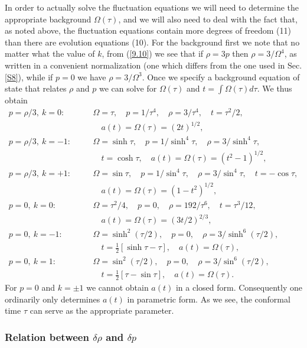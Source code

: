 In order to actually solve the fluctuation equations we will need to determine the appropriate background $\Omega(\tau)$, and we will also need to deal with the fact that, as noted above,  the fluctuation equations contain more degrees of freedom (11) than there are evolution equations (10). For the background first we note that no matter what the value of $k$, from (\ref{9.10}) we see that if $\rho=3p$ then $\rho=3/\Omega^4$,  as written in a convenient normalization (one which differs from the one used in Sec. \ref{S8}), while if $p=0$ we have $\rho=3/\Omega^3$. Once we specify a background equation of state that relates $\rho$ and $p$ we can solve for $\Omega (\tau)$ and $t=\int \Omega(\tau)d\tau$. We thus obtain 
%
\begin{eqnarray}
p=\rho/3,~k=0:&&\quad \Omega=\tau,\quad p=1/\tau^4,\quad \rho=3/\tau^4,\quad t=\tau^2/2,
\nonumber\\
&&\qquad a(t)=\Omega(\tau)=(2t)^{1/2},
\nonumber\\
p=\rho/3,~k=-1:&&\quad \Omega=\sinh\tau,\quad p=1/\sinh^4\tau,\quad \rho=3/\sinh^4\tau,
\nonumber\\
&& \qquad t=\cosh\tau,\quad a(t)=\Omega(\tau)=(t^2-1)^{1/2},
\nonumber\\
p=\rho/3,~k=+1:&&\quad \Omega=\sin\tau,\quad p=1/\sin^4\tau,\quad \rho=3/\sin^4\tau,\quad t=-\cos\tau,
\nonumber\\
&& \qquad a(t)=\Omega(\tau)=(1-t^2)^{1/2},
\nonumber\\
p=0,~k=0:&&\quad \Omega=\tau^2/4,\quad p=0,\quad \rho=192/\tau^6,\quad t=\tau^{3}/12,
\nonumber\\
&&\qquad a(t)=\Omega(\tau)=(3t/2)^{2/3},
\nonumber\\
p=0,~k=-1:&&\quad \Omega=\sinh^2(\tau/2),\quad p=0,\quad \rho=3/\sinh^6(\tau/2),
\nonumber\\
&& \qquad t=\tfrac{1}{2}[\sinh\tau-\tau],\quad a(t)=\Omega(\tau),
\nonumber\\
p=0,~k=1:&&\quad \Omega=\sin^2(\tau/2),\quad p=0,\quad \rho=3/\sin^6(\tau/2),
\nonumber\\
&& \qquad t=\tfrac{1}{2}[\tau-\sin\tau],\quad a(t)=\Omega(\tau).
\label{9.49}
\end{eqnarray}
%
For $p=0$ and $k=\pm 1$ we cannot obtain $a(t)$ in a closed form. Consequently one ordinarily only determines $a(t)$ in parametric form. As we see, the conformal time $\tau$ can serve as the appropriate parameter.

\subsubsection{Relation between $\delta\rho$ and $\delta p$}
\label{sss:relating_dp_drho_svt3}

